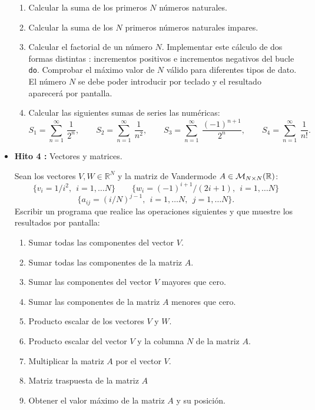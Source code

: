 \documentclass[12pt,spanish]{article}
\begin{document}
\begin{itemize}
\begin{enumerate}    
	\item Calcular la suma de los primeros $ N $  números naturales.
	
	\item Calcular la suma de los $ N $  primeros números naturales impares.
	
	\item Calcular el factorial de un número $ N $. Implementar este cálculo de dos
	formas distintas : incrementos positivos e incrementos negativos del bucle 
	\verb|do|. Comprobar el máximo valor de $N$ válido para diferentes tipos de dato.
    El número $ N $ se debe poder introducir por teclado y el resultado aparecerá
	por pantalla. 
	\item Calcular 
	 las siguientes sumas de series las numéricas: 	
	$$
	S_1 = \sum _{n=1} ^{\infty}  \  \frac{ 1 }{  2^n  }, \qquad 
	S_2 = \sum _{n=1} ^{\infty}  \  \frac{ 1 }{  n^2  }, \qquad  
	S_3 = \sum _{n=1} ^{\infty}  \  \frac{  (-1)^{n+1} }{  2^n  }, \qquad
	S_4 =\sum _{n=1} ^{\infty} \ \frac{ 1 } { n ! }. \qquad  
	$$
	
\end{enumerate}         

\newpage

\item {\bf Hito 4 :}   Vectores y matrices. 

Sean los vectores $V, W \in \mathbb{R}^N$ y la matriz de Vandermode $A \in 
{\cal M}_{N \times N} (\mathbb{R})$: 
$$
\{ v_i =  1/i^2, \ \  i=1, \ldots N \} \qquad  \{  w_i = (-1)^{i+1}/(2i+1), \ \   i=1, \ldots N  \} 
$$
$$
\{ a_{ij} = (i/N)^{j-1}, \ \ i=1, \ldots N, \ \  j=1, \ldots N \}. 
$$
Escribir un programa que realice las operaciones siguientes y que muestre los
resultados por pantalla: 
\begin{enumerate}
	\item Sumar todas las componentes del vector $V$. 
	\item Sumar todas las componentes de la matriz $A$.   
	\item Sumar las componentes del vector $V$ mayores que cero.
	\item Sumar las componentes de la matriz $A$ menores que cero.   
	\item Producto escalar de los vectores $V$ y $W$.   
	\item Producto escalar del vector $V$ y la columna $N$ de la matriz $A$. 
	\item Multiplicar la matriz $A$ por el vector $V$.
	\item Matriz traspuesta de la matriz $A$   
	\item Obtener el valor máximo de la matriz $A$ y su posición.
\end{enumerate}


\end{itemize}
\end{document}

